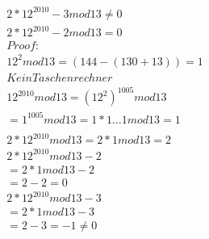 \documentclass[]{article}
\title{}
\author{}
\date{}
\begin{document}
\maketitle


\begin{gather*}
2*12^{2010} - 3 mod 13 \neq 0 \\
2*12^{2010} - 2 mod 13 =  0 \\  
Proof:\\ 
12^2  mod 13 = (144 - (130+13)) = 1 \\
Kein Taschenrechner\\
12^{2010} mod 13 = (12^2)^{1005} mod 13 \\
= 1^{1005} mod 13 = 1*1 \dots 1 mod 13 = 1 \\
\\
  2 * 12^{2010} mod 13 = 2*1 mod 13 = 2
  \\
  2 * 12^{2010} mod 13 -2  \\= 2*1 mod 13 -2 \\= 2-2  = 0\\
  2 * 12^{2010} mod 13 -3  \\= 2*1 mod 13 -3 \\= 2-3  = -1 \neq 0
  \end{gather*}


\section{}
\end{document}
